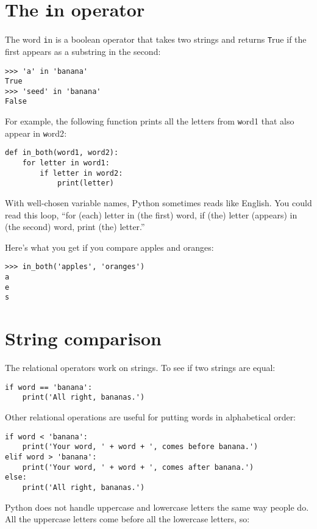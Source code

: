 \documentclass[
DIV=11,
fontsize=13,
twoside,
headinclude=false,
titlepage=firstiscover,
abstract=true,
headsepline=true,
footsepline=true,
chapterprefix=true, %
headings=big,
bibliography=totoc,%
captions=tableheading
]{scrbook}
\theoremstyle{definition}
\begin{document}
\section{The {\texttt in} operator}
\label{inboth}

The word {\texttt in} is a boolean operator that takes two strings and
returns {\texttt True} if the first appears as a substring in the second:

\begin{lstlisting}
>>> 'a' in 'banana'
True
>>> 'seed' in 'banana'
False
\end{lstlisting}
%
For example, the following function prints all the
letters from {\texttt word1} that also appear in {\texttt word2}:

\begin{lstlisting}
def in_both(word1, word2):
    for letter in word1:
        if letter in word2:
            print(letter)
\end{lstlisting}
%
With well-chosen variable names,
Python sometimes reads like English.  You could read
this loop, ``for (each) letter in (the first) word, if (the) letter 
(appears) in (the second) word, print (the) letter.''

Here's what you get if you compare apples and oranges:

\begin{lstlisting}
>>> in_both('apples', 'oranges')
a
e
s
\end{lstlisting}
%

\section{String comparison}

The relational operators work on strings.  To see if two strings are equal:

\begin{lstlisting}
if word == 'banana':
    print('All right, bananas.')
\end{lstlisting}
%
Other relational operations are useful for putting words in alphabetical
order:

\begin{lstlisting}
if word < 'banana':
    print('Your word, ' + word + ', comes before banana.')
elif word > 'banana':
    print('Your word, ' + word + ', comes after banana.')
else:
    print('All right, bananas.')
\end{lstlisting}
%
Python does not handle uppercase and lowercase letters the same way
people do.  All the uppercase letters come before all the
lowercase letters, so:
\end{document}
